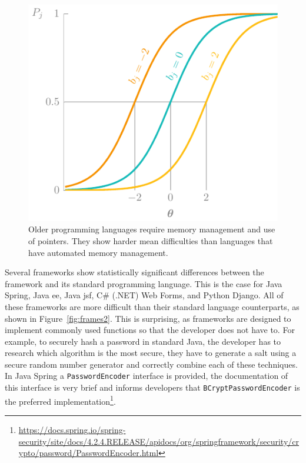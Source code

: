 \begin{figure}
    \centering
    \includegraphics[page=9]{03-education/figures/tikzfigures.pdf}
    \caption[Memory-safe versus memory-unsafe languages]{Older programming languages require memory management and use of pointers. They show harder mean difficulties than languages that have automated memory management.}
    \label{fig:frames1}
\end{figure}

Several frameworks show statistically significant differences between the framework and its standard programming language.
This is the case for Java Spring, Java \gls{ee}, Java \gls{jsf}, C\# (.NET) Web Forms, and Python Django.
All of these frameworks are more difficult than their standard language counterparts, as shown in Figure~\ref{fig:frames2}.
This is surprising, as frameworks are designed to implement commonly used functions so that the developer does not have to.
For example, to securely hash a password in standard Java, the developer has to research which algorithm is the most secure, they have to generate a salt using a secure random number generator and correctly combine each of these techniques.
In Java Spring a \texttt{PasswordEncoder} interface is provided, the documentation of this interface is very brief and informs developers that \texttt{BCryptPasswordEncoder} is the preferred implementation\footnote{\url{https://docs.spring.io/spring-security/site/docs/4.2.4.RELEASE/apidocs/org/springframework/security/crypto/password/PasswordEncoder.html}}.

